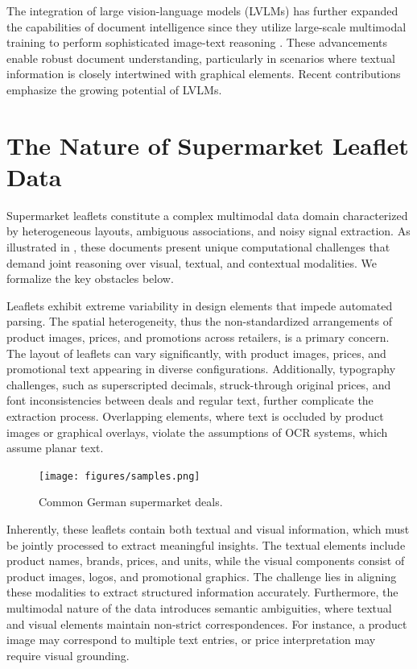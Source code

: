 \documentclass[11pt]{article}
\begin{document}
The integration of large vision-language models (LVLMs) has further expanded the capabilities of document intelligence since they utilize large-scale multimodal training to perform sophisticated image-text reasoning \cite{touvron2023,qwen2025,dai2023}. These advancements enable robust document understanding, particularly in scenarios where textual information is closely intertwined with graphical elements. Recent contributions \cite{li2024, wei2024} emphasize the growing potential of LVLMs. 

\section{The Nature of Supermarket Leaflet Data}  
\label{sec:leaflets_data}
Supermarket leaflets constitute a complex multimodal data domain characterized by heterogeneous layouts, ambiguous associations, and noisy signal extraction. As illustrated in , these documents present unique computational challenges that demand joint reasoning over visual, textual, and contextual modalities. We formalize the key obstacles below.

Leaflets exhibit extreme variability in design elements that impede automated parsing. The spatial heterogeneity, thus the non-standardized arrangements of product images, prices, and promotions across retailers, is a primary concern. The layout of leaflets can vary significantly, with product images, prices, and promotional text appearing in diverse configurations. Additionally, typography challenges, such as superscripted decimals, struck-through original prices, and font inconsistencies between deals and regular text, further complicate the extraction process. Overlapping elements, where text is occluded by product images or graphical overlays, violate the assumptions of OCR systems, which assume planar text.

\begin{figure}[h!]
    \centering
    \texttt{[image: figures/samples.png]}
    \caption{Common German supermarket deals.}
    \label{fig:leaflet_data_samples}
\end{figure}

Inherently, these leaflets contain both textual and visual information, which must be jointly processed to extract meaningful insights. The textual elements include product names, brands, prices, and units, while the visual components consist of product images, logos, and promotional graphics. The challenge lies in aligning these modalities to extract structured information accurately. Furthermore, the multimodal nature of the data introduces semantic ambiguities, where textual and visual elements maintain non-strict correspondences. For instance, a product image may correspond to multiple text entries, or price interpretation may require visual grounding.
\end{document}
